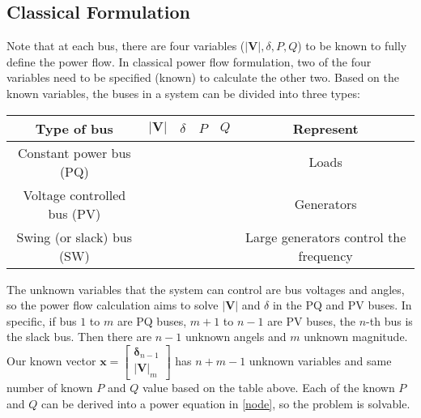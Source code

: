 \documentclass[journal,12pt,onecolumn,draftclsnofoot]{IEEEtran}
\newcommand{\V}{\boldsymbol{V}}
\newcommand{\cmark}{\ding{51}}
\newcommand{\xmark}{\ding{55}}
\newcommand{\x}{\boldsymbol{x}}
\newcommand{\icol}[1]{%
  \left[\begin{matrix}#1\end{matrix}\right]%
}
\theoremstyle{definition}
\begin{document}
\subsection{Classical Formulation}
Note that at each bus, there are four variables ($|\V|,\delta,P,Q$) to be known to fully define the power flow. In classical power flow formulation, two of the four variables need to be specified (known) to calculate the other two. Based on the known variables, the buses in a system can be divided into three types:
\begin{table}[h]
\renewcommand{\arraystretch}{1.3}
\label{bus_type}
\centering
\begin{tabular}{clcccc}
\hline
\bfseries Type of bus & $|\V|$ & $\delta$ & $P$ & $Q$ & Represent\\
\hline
Constant power bus (PQ) & \xmark & \xmark & \cmark & \cmark & Loads\\
Voltage controlled bus (PV) & \cmark & \xmark & \cmark & \xmark & Generators\\
Swing (or slack) bus (SW) & \cmark & \cmark & \xmark &\xmark & Large generators control the frequency\\
\hline
\end{tabular}
\end{table}
The unknown variables that the system can control are bus voltages and angles, so the power flow calculation aims to solve $|\V|$ and $\delta$ in the PQ and PV buses. In specific, if bus $1$ to $m$ are PQ buses, $m+1$ to $n-1$ are PV buses, the $n$-th bus is the slack bus. Then there are $n-1$ unknown angels and $m$ unknown magnitude. Our known vector  $\x = \icol{\boldsymbol{\delta}_{n-1}\\|\V|_m}$ has $n+m-1$ unknown variables and same number of known $P$ and $Q$ value based on the table above. Each of the known $P$ and $Q$ can be derived into a power equation in \eqref{node}, so the problem is solvable.
\end{document}
